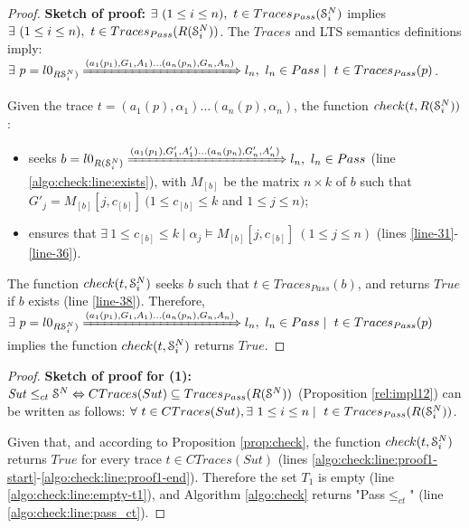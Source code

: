 \begin{proof}
    \textbf{Sketch of proof:} $\exists ~(1 \leq i \leq n), ~t \in
    Traces_{Pass}(\EuScript{S}_i^{N})$ implies $\exists ~(1 \leq i
    \leq n), ~t \in Traces_{Pass}(R(\EuScript{S}_i^{N}))$.
    The $Traces$ and LTS semantics definitions imply: $\exists
    ~p = l0_{R\EuScript{S}_i^{N})} \xRightarrow{(a_1(p_1),G_{1},A_{1}) \dots
    (a_n(p_n),G_{n},A_{n})} l_n, ~l_n \in Pass \mid ~t \in
    Traces_{Pass}(p)$.

    Given the trace $t = (a_1(p), \alpha_1) \dots (a_n(p),
    \alpha_n)$, the function $check(t, R(\EuScript{S}_i^{N}))$:

    \begin{itemize}
        \item seeks $b = l0_{R(\EuScript{S}_i^{N})}
            \xRightarrow{(a_1(p_1),G'_{1},A'_{1}) \dots
            (a_n(p_n),G'_{n},A'_{n})} l_n, ~l_n \in Pass$ (line
            \ref{algo:check:line:exists}), with $M_{[b]}$ be
            the matrix $n \times k$ of $b$ such that $G'_j =
            M_{[b]}[j, c_{[b]}] ~(1 \leq c_{[b]} \leq k$ and
            $1 \leq j \leq n)$;

        \item ensures that $\exists ~1 \leq c_{[b]} \leq k
            \mid \alpha_j \models M_{[b]}[j, c_{[b]}] ~(1
            \leq j \leq n)$ (lines \ref{line-31}-\ref{line-36}).
    \end{itemize}

    The function $check(t, \EuScript{S}_i^N)$ seeks $b$ such that $t \in
    Traces_{Pass}(b)$, and returns $True$ if $b$ exists (line
    \ref{line-38}).
    Therefore, $\exists ~p = l0_{R\EuScript{S}_i^{N})}
    \xRightarrow{(a_1(p_1),G_{1},A_{1}) \dots
    (a_n(p_n),G_{n},A_{n})} l_n, ~l_n \in Pass \mid ~t \in
    Traces_{Pass}(p)$ implies the function $check(t,
    \EuScript{S}_i^N)$ returns $True$.
\end{proof}


\begin{proof}
    \textbf{Sketch of proof for (1):} $\mathit{Sut} \leq_{ct} \EuScript{S}^{N}
    \Leftrightarrow CTraces(Sut) \subseteq Traces_{Pass}(R(\EuScript{S}^N))$
    (Proposition \ref{rel:impl12}) can be written as
    follows: $\forall ~t \in CTraces(Sut), \exists ~1
    \leq i \leq n \mid ~t \in Traces_{Pass}(R(\EuScript{S}_i^{N}))$.

    Given that, and according to Proposition
    \ref{prop:check}, the function $check(t, \EuScript{S}_i^N)$ returns $True$ for
    every trace $t \in CTraces(Sut)$ (lines
    \ref{algo:check:line:proof1-start}-\ref{algo:check:line:proof1-end}).
    Therefore the set $T_1$ is empty (line
    \ref{algo:check:line:empty-t1}), and Algorithm
    \ref{algo:check} returns "Pass$\leq_{ct}$" (line
    \ref{algo:check:line:pass_ct}).
\end{proof}

